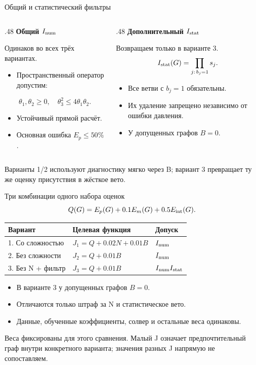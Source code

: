 \documentclass{beamer}
\begin{document}
\begin{frame}{Общий и статистический фильтры}\small
\begin{columns}[T]
\begin{column}{.48\textwidth}
\textbf{Общий $I_{\rm num}$}\par\medskip
Одинаков во всех трёх вариантах.
\begin{itemize}
\item Пространственный оператор допустим:
\end{itemize}
\[\theta_1,\theta_2\ge0,\quad \theta_3^2\le4\theta_1\theta_2.\]
\begin{itemize}
\item Устойчивый прямой расчёт.
\item Основная ошибка $E_p\le50\%$.
\end{itemize}
\end{column}
\begin{column}{.48\textwidth}
\textbf{Дополнительный $I_{\rm stat}$}\par\medskip
Возвращаем только в варианте 3.
\[I_{\rm stat}(G)=\prod_{j:\,b_j=1}s_j.\]
\begin{itemize}
\item Все ветви с $b_j=1$ обязательны.
\item Их удаление запрещено независимо от ошибки давления.
\item У допущенных графов $B=0$.
\end{itemize}
\end{column}
\end{columns}
\medskip
\footnotesize Варианты 1/2 используют диагностику мягко через B;
вариант 3 превращает ту же оценку присутствия в жёсткое вето.
\end{frame}

\begin{frame}{Три комбинации одного набора оценок}\small
\[Q(G)=E_p(G)+0.1E_m(G)+0.5E_{\rm int}(G).\]
\renewcommand{\arraystretch}{1.7}
\begin{tabular}{@{}lll@{}}\toprule
Вариант & Целевая функция & Допуск\\\midrule
1. Со сложностью & $J_1=Q+0.02N+0.01B$ & $I_{\rm num}$\\
2. Без сложности & $J_2=Q+0.01B$ & $I_{\rm num}$\\
3. Без N + фильтр & $J_3=Q+0.01B$ & $I_{\rm num}I_{\rm stat}$\\\bottomrule
\end{tabular}\par\medskip
\begin{itemize}
\item В варианте 3 у допущенных графов $B=0$.
\item Отличаются только штраф за N и статистическое вето.
\item Данные, обученные коэффициенты, солвер и остальные веса одинаковы.
\end{itemize}
\footnotesize Веса фиксированы для этого сравнения. Малый J означает предпочтительный
граф внутри конкретного варианта; значения разных J напрямую не сопоставляем.
\end{frame}
\end{document}
